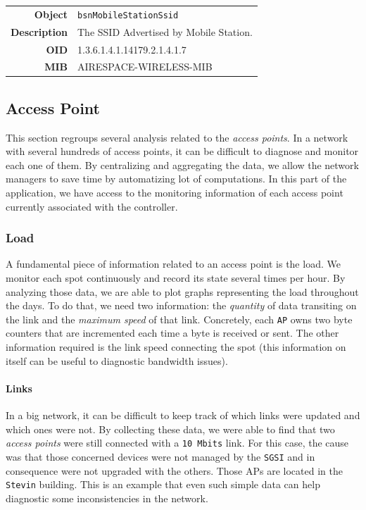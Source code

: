 \begin{tabular}{|r l|}
\hline
\textbf{Object} & \texttt{bsnMobileStationSsid} \\
\textbf{Description} & \parbox{11cm}{The SSID Advertised by Mobile Station.} \\
\textbf{OID} & 1.3.6.1.4.1.14179.2.1.4.1.7 \\
\textbf{MIB} & AIRESPACE-WIRELESS-MIB \\
\hline
\end{tabular}

\subsection{Access Point}
This section regroups several analysis related to the \emph{access points}. In a network with several hundreds of access points, it can be difficult to diagnose and monitor each one of them. By centralizing and aggregating the data, we allow the network managers to save time by automatizing lot of computations. In this part of the application, we have access to the monitoring information of each access point currently associated with the controller.

\subsubsection*{Load}
A fundamental piece of information related to an access point is the load. We monitor each spot continuously and record its state several times per hour. By analyzing those data, we are able to plot graphs representing the load throughout the days. To do that, we need two information: the \textit{quantity} of data transiting on the link and the \textit{maximum speed} of that link. Concretely, each \texttt{AP} owns two byte counters that are incremented each time a byte is received or sent. The other information required is the link speed connecting the spot (this information on itself can be useful to diagnostic bandwidth issues). 

\paragraph*{Links} In a big network, it can be difficult to keep track of which links were updated and which ones were not. By collecting these data, we were able to find that two \emph{access points} were still connected with a \texttt{10 Mbits} link. For this case, the cause was that those concerned devices were not managed by the \texttt{SGSI} and in consequence were not upgraded with the others. Those APs are located in the \texttt{Stevin} building.
This is an example that even such simple data can help diagnostic some inconsistencies in the network.

